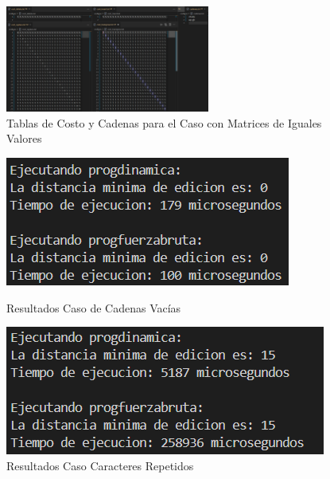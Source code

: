 \begin{figure}[ht]
  \centering
  \includegraphics[width=0.6\textwidth]{./images/Casos5.png}
  \caption{Tablas de Costo y Cadenas para el Caso con Matrices de Iguales Valores}
  \label{fig:imagen5}
\end{figure}
\newpage

\begin{figure}[h!]
    \centering
    \begin{minipage}{0.47\textwidth}
        \centering
        \includegraphics[width=\linewidth]{./images/Resultados1.png}
        \caption{Resultados Caso de Cadenas Vacías}
        \label{fig:imagen6}
    \end{minipage}
    \hfill
    \begin{minipage}{0.47\textwidth}
        \centering
        \includegraphics[width=\linewidth]{./images/Resultados2.png}
        \caption{Resultados Caso Caracteres Repetidos}
        \label{fig:imagen7}
    \end{minipage}


\end{figure}
